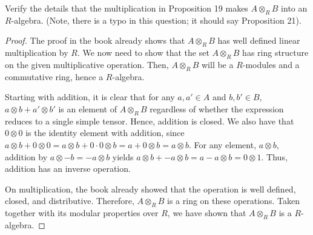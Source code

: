 \documentclass[10pt]{article}
\newenvironment{problem}[2][Problem]{\begin{trivlist}
		\item[\hskip \labelsep {\bfseries #1}\hskip \labelsep {\bfseries #2.}]}{\end{trivlist}}
\begin{document}
	\begin{problem}{4.23}
		Verify the details that the multiplication in Proposition 19 makes $A \otimes_R B$ into an $R$-algebra. (Note, there is a typo in this question; it should say Proposition 21).
		\begin{proof}
			The proof in the book already shows that $A \otimes_R B$ has well defined linear multiplication by $R$. We now need to show that the set $A \otimes_R B$ has ring structure on the given multiplicative operation. Then, $A \otimes_R B$ will be a $R$-modules and a commutative ring, hence a $R$-algebra.
			
			Starting with addition, it is clear that for any $a, a' \in A$ and $b, b' \in B$, $a\otimes b + a' \otimes b'$ is an element of $A \otimes_R B$ regardless of whether the expression reduces to a single simple tensor. Hence, addition is closed. We also have that $0 \otimes 0$ is the identity element with addition, since $a \otimes b + 0 \otimes 0 = a \otimes b + 0\cdot0 \otimes b = a + 0 \otimes b = a \otimes b$. For any element, $a \otimes b$, addition by $a \otimes -b = -a \otimes b$ yields $a \otimes b + -a \otimes b = a-a \otimes b = 0 \otimes 1$. Thus, addition has an inverse operation.
			
			On multiplication, the book already showed that the operation is well defined, closed, and distributive. Therefore, $A \otimes_RB$ is a ring on these operations. Taken together with its modular properties over $R$, we have shown that $A\otimes_R B$ is a $R$-algebra.
		\end{proof}
	\end{problem}
	
\end{document}
